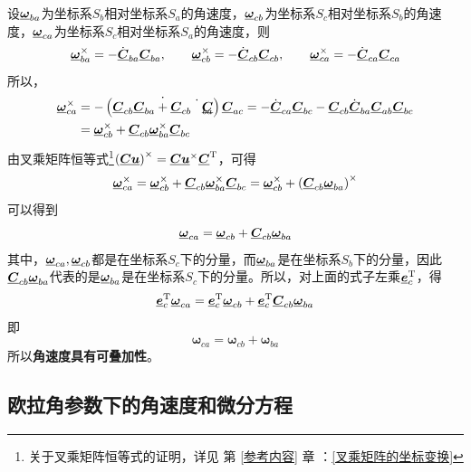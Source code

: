 设$\underline{\bm{\omega}}_{ba}$为坐标系$S_b$相对坐标系$S_a$的角速度，$\underline{\bm{\omega}}_{cb}$为坐标系$S_c$相对坐标系$S_b$的角速度，$\underline{\bm{\omega}}_{ca}$为坐标系$S_c$相对坐标系$S_a$的角速度，则
\begin{equation}
	\underline{\bm{\omega}}_{ba}^\times = - \dot{\underline{\bm{C}}}_{ba} \underline{\bm{C}}_{ba}, \qquad 
	\underline{\bm{\omega}}_{cb}^\times = - \dot{\underline{\bm{C}}}_{cb} \underline{\bm{C}}_{cb}, \qquad 
	\underline{\bm{\omega}}_{ca}^\times = - \dot{\underline{\bm{C}}}_{ca} \underline{\bm{C}}_{ca}
\end{equation}
所以，
\begin{align*}
	\underline{\bm{\omega}}_{ca}^\times &= -\left(\dot{\underline{\bm{C}}_{cb} \underline{\bm{C}}_{ba} + \underline{\bm{C}}_{cb}\dot{\underline{\bm{C}}}_{ba}}\right)\underline{\bm{C}}_{ac} 
	= -\dot{\underline{\bm{C}}}_{ca} \underline{\bm{C}}_{bc} - \underline{\bm{C}}_{cb} \dot{\underline{\bm{C}}}_{ba} \underline{\bm{C}}_{ab} \underline{\bm{C}}_{bc} \\
	&= \underline{\bm{\omega}}_{cb}^\times + \underline{\bm{C}}_{cb} \underline{\bm{\omega}}_{ba}^\times \underline{\bm{C}}_{bc}
\end{align*}
由叉乘矩阵恒等式\footnote[1]{关于叉乘矩阵恒等式的证明，详见 第 \ref{参考内容} 章 ：\ref{叉乘矩阵的坐标变换}  \link[叉乘矩阵的坐标变换]}$\left( \underline{\bm{C}} \underline{\bm{u}} \right)^\times = \underline{\bm{C}} \underline{\bm{u}}^\times \underline{\bm{C}}^{\text{T}}$，可得
\begin{equation*}
	\underline{\bm{\omega}}_{ca}^\times = \underline{\bm{\omega}}_{cb}^\times + \underline{\bm{C}}_{cb} \underline{\bm{\omega}}_{ba}^\times \underline{\bm{C}}_{bc} = \underline{\bm{\omega}}_{cb}^\times + \left( \underline{\bm{C}}_{cb} \underline{\bm{\omega}}_{ba} \right)^\times
\end{equation*}
可以得到
\begin{equation}
	\underline{\bm{\omega}}_{ca} = \underline{\bm{\omega}}_{cb} + \underline{\bm{C}}_{cb}\underline{\bm{\omega}}_{ba}
\end{equation}
其中，$\underline{\bm{\omega}}_{ca}, \underline{\bm{\omega}}_{cb}$都是在坐标系$S_c$下的分量，而$\underline{\bm{\omega}}_{ba}$是在坐标系$S_b$下的分量，因此$\underline{\bm{C}}_{cb}\underline{\bm{\omega}}_{ba}$代表的是$\underline{\bm{\omega}}_{ba}$是在坐标系$S_c$下的分量。所以，对上面的式子左乘$\underline{\bm{e}}_c^{\text{T}}$，得
\begin{equation*}
	\underline{\bm{e}}_c^{\text{T}} \underline{\bm{\omega}}_{ca} = \underline{\bm{e}}_c^{\text{T}} \underline{\bm{\omega}}_{cb} + \underline{\bm{e}}_c^{\text{T}} \underline{\bm{C}}_{cb}\underline{\bm{\omega}}_{ba}
\end{equation*}
即
\begin{equation}
	\bm{\omega}_{ca} = \bm{\omega}_{cb} + \bm{\omega}_{ba}
\end{equation}
所以\textbf{角速度具有可叠加性}。



\subsection{欧拉角参数下的角速度和微分方程}

